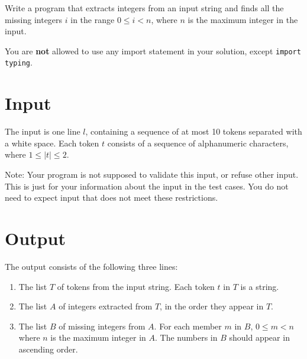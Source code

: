 
Write a program that extracts integers from an input string and finds all the missing integers $i$ in the range $0 \le i < n$, where $n$ is the maximum integer in the input.

You are \textbf{not} allowed to use any import statement in your solution, except \texttt{import typing}.

\section*{Input}
The input is one line $l$, containing a sequence of at most 10 tokens separated with a white space.  
Each token $t$ consists of a sequence of alphanumeric characters, where $1 \le |t| \le 2$.

Note: Your program is not supposed to validate this input, or refuse other input.
This is just for your information about the input in the test cases. 
You do not need to expect input that does not meet these restrictions.

\section*{Output}
The output consists of the following three lines:
\begin{enumerate}
    \item The list $T$ of tokens from the input string. Each token $t$ in $T$ is a string.
    \item The list $A$ of integers extracted from $T$,
    in the order they appear in $T$.
    \item The list $B$ of missing integers from $A$.
    For each member $m$ in $B$,  $0 \le m < n$ where $n$ is the maximum integer in $A$.
    The numbers in $B$ should appear in ascending order.
\end{enumerate}
